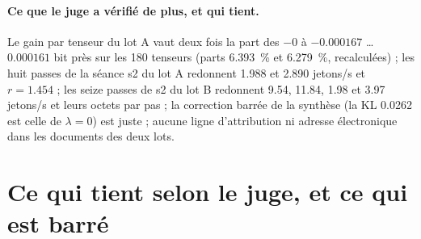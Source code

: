 \paragraph{Ce que le juge a vérifié de plus, et qui tient.} Le gain par tenseur du lot A vaut deux fois la part des $-0$ à $\num{-0.000167}$ … $\num{0.000161}$ bit près sur les 180 tenseurs (parts \SI{6.393}{\percent} et \SI{6.279}{\percent}, recalculées) ; les huit passes de la séance s2 du lot A redonnent \num{1.988} et \num{2.890} jetons/s et $r = \num{1.454}$ ; les seize passes de s2 du lot B redonnent \num{9.54}, \num{11.84}, \num{1.98} et \num{3.97} jetons/s et leurs octets par pas ; la correction barrée de la synthèse (la KL \num{0.0262} est celle de $\lambda = 0$) est juste ; aucune ligne d'attribution ni adresse électronique dans les documents des deux lots.

\section{Ce qui tient selon le juge, et ce qui est barré}\label{t3jug:sec:bilan}

